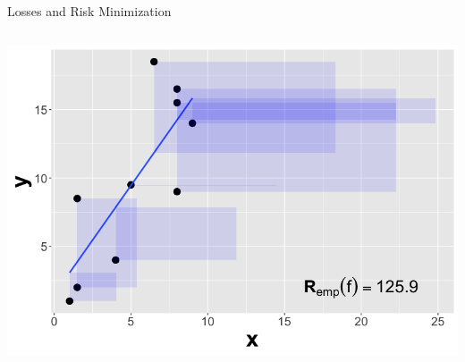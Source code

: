 \documentclass[11pt,compress,t,notes=noshow, xcolor=table]{beamer}
\begin{document}
\begin{vbframe}{Losses and Risk Minimization}
\begin{itemize}
\begin{columns}
\begin{column}{0.48\textwidth}
  \begin{center}
    \includegraphics[width=\textwidth]{slides/ml-basics/figure_man/nutshell-ml-basics-empirical-risk-regression.png} 
  \end{center}
\end{column} 
\end{columns}
\end{itemize}






\end{vbframe}
\end{document}
